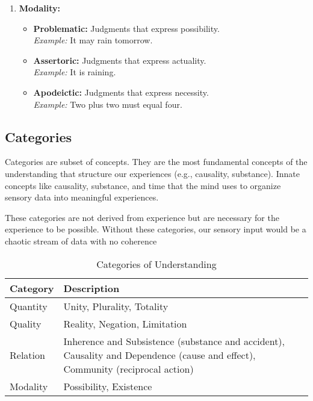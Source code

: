 \documentclass[a4paper]{article}
\begin{document}
\begin{enumerate}
\begin{itemize}
    \end{itemize}
    \item \textbf{Modality:}
    \begin{itemize}
        \item \textbf{Problematic:} Judgments that express possibility. \\
        \textit{Example:} It may rain tomorrow.
        \item \textbf{Assertoric:} Judgments that express actuality. \\
        \textit{Example:} It is raining.
        \item \textbf{Apodeictic:} Judgments that express necessity. \\
        \textit{Example:} Two plus two must equal four.
    \end{itemize}
\end{enumerate}


\subsection{Categories}
Categories are subset of concepts.
They are the most fundamental concepts of the understanding that structure our experiences (e.g., causality, substance).
Innate concepts like causality, substance, and time that the mind uses to organize sensory data into meaningful experiences.

These categories are not derived from experience but are necessary for the experience to be possible. 
Without these categories, our sensory input would be a chaotic stream of data with no coherence

\begin{table}[h!]
\centering
\begin{tabular}{|p{2cm}|p{10cm}|}
\hline
\textbf{Category} & \textbf{Description} \\
\hline
Quantity & Unity, Plurality, Totality \\
\hline
Quality & Reality, Negation, Limitation \\
\hline
Relation & Inherence and Subsistence (substance and accident), Causality and Dependence (cause and effect), Community (reciprocal action) \\
\hline
Modality & Possibility, Existence \\
\hline
\end{tabular}
\caption{Categories of Understanding}
\label{tab:categories}
\end{table}
\end{document}
